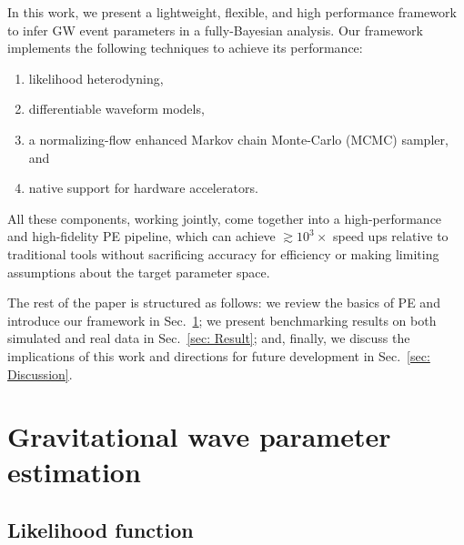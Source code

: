 \documentclass[twocolumn]{aastex631}
\begin{document}

In this work, we present a lightweight, flexible, and high performance
framework to infer GW event parameters in a fully-Bayesian analysis. Our
framework implements the following techniques to achieve its performance:
\begin{enumerate}
\setlength{\itemsep}{0pt}
\item likelihood heterodyning,
\item differentiable waveform models,
\item a normalizing-flow enhanced Markov chain Monte-Carlo (MCMC) sampler, and
\item native support for hardware accelerators.
\end{enumerate}
All these components, working jointly, come together into a high-performance
and high-fidelity PE pipeline, which can achieve ${\gtrsim}10^3\times$ speed
ups relative to traditional tools without sacrificing accuracy for efficiency
or making limiting assumptions about the target parameter space.

The rest of the paper is structured as follows: we review the basics of PE and
introduce our framework in Sec.~\ref{sec: PE}; we present benchmarking results
on both simulated and real data in Sec.~\ref{sec: Result}; and, finally, we
discuss the implications of this work and directions for future development in
Sec.~\ref{sec: Discussion}.

\section{Gravitational wave parameter estimation}
\label{sec: PE}

\subsection{Likelihood function}
\label{sec:likelihood}
\end{document}
